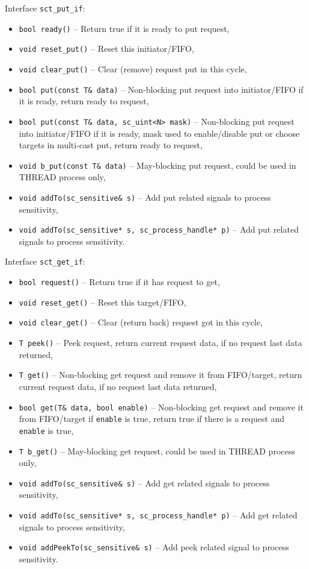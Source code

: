 Interface {\tt sct\_put\_if}:
\begin{itemize}
\item {\tt bool ready()} -- Return true if it is ready to put request,
\item {\tt void reset\_put()} -- Reset this initiator/FIFO, 
\item {\tt void clear\_put()} -- Clear (remove) request put in this cycle,
\item {\tt bool put(const T\& data)} -- Non-blocking put request into initiator/FIFO if it is ready, return ready to request, 
\item {\tt bool put(const T\& data, sc\_uint<N> mask)} -- Non-blocking put request into initiator/FIFO if it is ready, mask  used to enable/disable put or choose targets in multi-cast put, return ready to request, 
\item {\tt void b\_put(const T\& data)} -- May-blocking put request, could be used in THREAD process only,
\item {\tt void addTo(sc\_sensitive\& s)} -- Add put related signals to process sensitivity,
\item {\tt void addTo(sc\_sensitive* s, sc\_process\_handle* p)} -- Add put related signals to process sensitivity.
\end{itemize}

Interface {\tt sct\_get\_if}:
\begin{itemize}
\item {\tt bool request()} -- Return true if it has request to get,
\item {\tt void reset\_get()} -- Reset this target/FIFO,
\item {\tt void clear\_get()} -- Clear (return back) request got in this cycle,
\item {\tt T peek()} -- Peek request, return current request data, if no request last data returned,
\item {\tt T get()} -- Non-blocking get request and remove it from FIFO/target, return current request data, if no request last data returned,
\item {\tt bool get(T\& data, bool enable)} -- Non-blocking get request and remove it from FIFO/target if {\tt enable} is true, return true if there is a request and {\tt enable} is true,
\item {\tt T b\_get()} -- May-blocking get request, could be used in THREAD process only,
\item {\tt void addTo(sc\_sensitive\& s)} -- Add get related signals to process sensitivity,
\item {\tt void addTo(sc\_sensitive* s, sc\_process\_handle* p)} -- Add get related signals to process sensitivity,
\item {\tt void addPeekTo(sc\_sensitive\& s)} -- Add peek related signal to process sensitivity.
\end{itemize}

